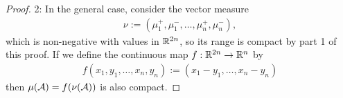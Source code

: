 \begin{proof}
2: In the general case, consider the vector measure
\begin{align*}
	\nu:=(\mu_{1}^{+}, \mu_{1}^{-}, \dots, \mu_{n}^{+}, \mu_{n}^{-}),
\end{align*}
which is non-negative with values in $\mathbb{R}^{2n}$, so its range is compact by part 1 of this proof. If we define the continuous map $f:\mathbb{R}^{2n}\to \mathbb{R}^{n}$ by
\begin{align*}
	f(x_{1},y_{1}, \dots, x_{n},y_{n}):=(x_{1}-y_{1}, \dots, x_{n}-y_{n})
\end{align*}
then $\mu(\mathcal{A})=f(\nu(\mathcal{A}))$ is also compact.
\end{proof}





